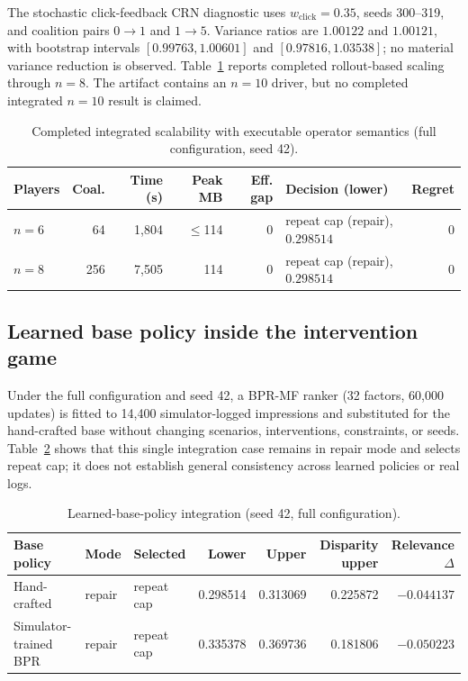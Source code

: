 \documentclass[review]{elsarticle}
\theoremstyle{plain}
\theoremstyle{definition}
\theoremstyle{remark}
\begin{document}
\begin{appendices}
The stochastic click-feedback CRN diagnostic uses $w_{\mathrm{click}}=0.35$, seeds 300--319, and coalition pairs $0\to1$ and $1\to5$. Variance ratios are $1.00122$ and $1.00121$, with bootstrap intervals $[0.99763,1.00601]$ and $[0.97816,1.03538]$; no material variance reduction is observed. Table~\ref{tab:integrated-scalability} reports completed rollout-based scaling through $n=8$. The artifact contains an $n=10$ driver, but no completed integrated $n=10$ result is claimed.

\FloatBarrier
\begin{table}[!ht]
\caption{Completed integrated scalability with executable operator semantics (full configuration, seed 42).}\label{tab:integrated-scalability}
\centering
\scriptsize
\setlength{\tabcolsep}{3pt}
\begin{tabular}{@{}lrrrrlr@{}}
\toprule
Players & Coal. & Time (s) & Peak MB & Eff. gap & Decision (lower) & Regret\\
\midrule
$n=6$ & 64 & 1,804 & $\leq$114 & 0 & repeat cap (repair), $0.298514$ & 0\\
$n=8$ & 256 & 7,505 & 114 & 0 & repeat cap (repair), $0.298514$ & 0\\
\bottomrule
\end{tabular}
\end{table}
\FloatBarrier

\subsection{Learned base policy inside the intervention game}\label{sec:semireal}
Under the full configuration and seed 42, a BPR-MF ranker (32 factors, 60,000 updates) is fitted to 14,400 simulator-logged impressions and substituted for the hand-crafted base without changing scenarios, interventions, constraints, or seeds. Table~\ref{tab:semireal} shows that this single integration case remains in repair mode and selects repeat cap; it does not establish general consistency across learned policies or real logs.

\FloatBarrier
\begin{table}[!ht]
\caption{Learned-base-policy integration (seed 42, full configuration).}\label{tab:semireal}
\centering
\scriptsize
\setlength{\tabcolsep}{3pt}
\begin{tabularx}{\linewidth}{@{}Xllrrrr@{}}
\toprule
Base policy & Mode & Selected & Lower & Upper & Disparity upper & Relevance $\Delta$\\
\midrule
Hand-crafted & repair & repeat cap & 0.298514 & 0.313069 & 0.225872 & $-0.044137$\\
Simulator-trained BPR & repair & repeat cap & 0.335378 & 0.369736 & 0.181806 & $-0.050223$\\
\bottomrule
\end{tabularx}
\end{table}
\FloatBarrier


\end{appendices}
\end{document}
